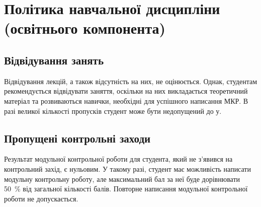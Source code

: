\documentclass{Syllabus}
\begin{document}
{}

\section{Політика навчальної дисципліни (освітнього компонента)}


\subsection*{Відвідування занять}
Відвідування лекцій, а також відсутність на них, не оцінюється. Однак, студентам рекомендується відвідувати заняття, оскільки на них викладається теоретичний матеріал та розвиваються навички, необхідні для успішного написання МКР. В разі великої кількості пропусків студент може бути недопущений до \control у.

\subsection*{Пропущені контрольні заходи}

Результат модульної контрольної роботи для студента, який не з’явився на контрольний захід, є нульовим. У такому разі, студент має можливість написати модульну контрольну роботу, але максимальний бал за неї буде дорівнювати 50~\% від загальної кількості балів. Повторне написання модульної контрольної роботи не допускається.
\end{document}
